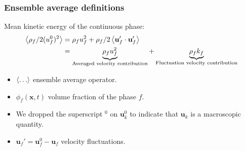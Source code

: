 \documentclass{sintefbeamer}
\begin{document}
\begin{frame}
  \frametitle{Ensemble average definitions}
Mean kinetic energy of the continuous phase: 
\begin{align*}
  \left<\rho_f /2 (u_f^0)^2\right>
  &=
  \rho_f u_f^2
  + 
  \rho_f/2 \left<\textbf{u}_f'\cdot \textbf{u}_f'\right>\\
  &=
  \underbrace{\rho_f u_f^2}_\text{Averaged velocity contribution}
  + 
  \underbrace{\rho_f k_f}_\text{Fluctuation velocity contribution}
\end{align*}


\begin{definition}
  \begin{itemize}
    \item $\left<\ldots\right>$ ensemble average operator. 
    \item  $\phi_f (\textbf{x},t)$ volume fraction of the phase $f$. 
    \item We dropped the superscript $^0$ on $\textbf{u}^0_k$ to indicate that $\textbf{u}_k$ is a macroscopic quantity. 
    \item $\textbf{u}_f' = \textbf{u}_f^0 - \textbf{u}_f$ velocity fluctuations. 
  \end{itemize}
\end{definition}
\end{frame}
\end{document}

